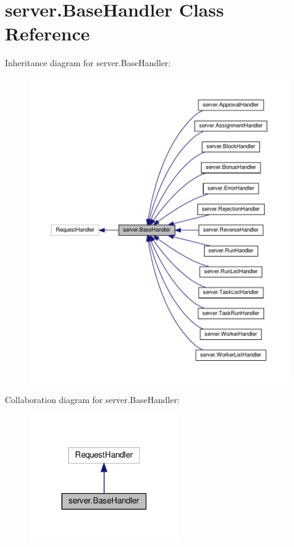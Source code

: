 \hypertarget{classserver_1_1BaseHandler}{}\section{server.\+Base\+Handler Class Reference}
\label{classserver_1_1BaseHandler}


Inheritance diagram for server.\+Base\+Handler\+:
\nopagebreak
\begin{figure}[H]
\begin{center}
\leavevmode
\includegraphics[width=350pt]{classserver_1_1BaseHandler__inherit__graph}
\end{center}
\end{figure}


Collaboration diagram for server.\+Base\+Handler\+:
\nopagebreak
\begin{figure}[H]
\begin{center}
\leavevmode
\includegraphics[width=183pt]{classserver_1_1BaseHandler__coll__graph}
\end{center}
\end{figure}

